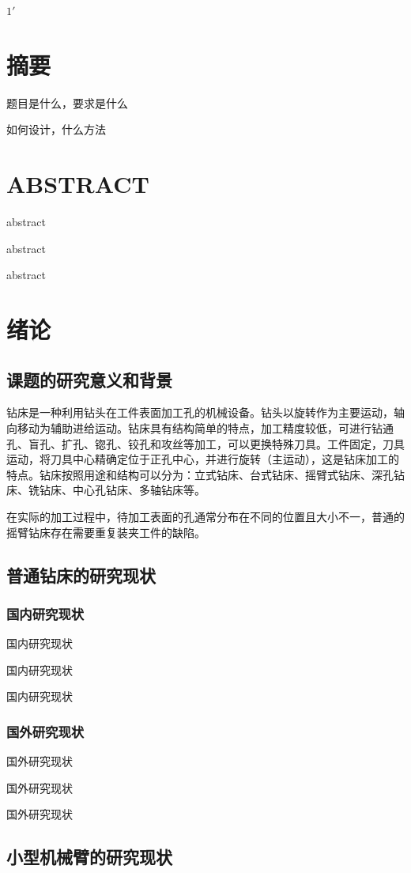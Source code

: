 \documentclass[UTF8]{article}%
\newcommand{\sun}{\CJKfamily{sun}}
\newcommand{\xiaosihao}{\fontsize{12pt}{\baselineskip}\selectfont}%
\newcommand{\n}{\par}%
\begin{document}
\begin{spacing}{1.5}%
	$1'$
\setlength{\parindent}{2em}%
\sun\xiaosihao%
\setlength{\abovedisplayskip}{1.5pt}%
\setlength{\belowdisplayskip}{1.5pt}%
\section*{摘要}
	题目是什么，要求是什么\n
	如何设计，什么方法\n
\clearpage
\section*{ABSTRACT}
	abstract\n
	abstract\n
	abstract\n
\clearpage
\begin{spacing}{1.2}
	\tableofcontents%
\end{spacing}
\clearpage
{}%
\setcounter{page}{1}%
\section{绪论}
	\subsection{课题的研究意义和背景}
	钻床是一种利用钻头在工件表面加工孔的机械设备。钻头以旋转作为主要运动，轴向移动为辅助进给运动。钻床具有结构简单的特点，加工精度较低，可进行钻通孔、盲孔、扩孔、锪孔、铰孔和攻丝等加工，可以更换特殊刀具。工件固定，刀具运动，将刀具中心精确定位于正孔中心，并进行旋转（主运动），这是钻床加工的特点。钻床按照用途和结构可以分为：立式钻床、台式钻床、摇臂式钻床、深孔钻床、铣钻床、中心孔钻床、多轴钻床等。\n
	在实际的加工过程中，待加工表面的孔通常分布在不同的位置且大小不一，普通的摇臂钻床存在需要重复装夹工件的缺陷。
	\subsection{普通钻床的研究现状}
		\subsubsection{国内研究现状}
		国内研究现状\n
		国内研究现状\n
		国内研究现状\n
		\subsubsection{国外研究现状}
		国外研究现状\n
		国外研究现状\n
		国外研究现状\n
	\subsection{小型机械臂的研究现状}

\end{spacing}
\end{document}
